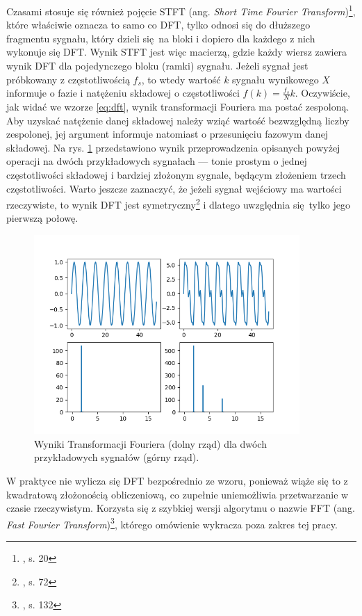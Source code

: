 Czasami stosuje się również pojęcie STFT (ang. \emph{Short Time Fourier Transform})\footnote{\cite{lerch_introduction_2012}, s. 20}, które właściwie oznacza to samo co DFT, tylko odnosi się do dłuższego fragmentu sygnału, który dzieli się na bloki i dopiero dla każdego z nich wykonuje się DFT. Wynik STFT jest więc macierzą, gdzie każdy wiersz zawiera wynik DFT dla pojedynczego bloku (ramki) sygnału. Jeżeli sygnał jest próbkowany z częstotliwością $f_s$, to wtedy wartość $k$ sygnału wynikowego $X$ informuje o fazie i natężeniu składowej o częstotliwości $f(k) = \frac{f_s}{N}k$.  Oczywiście, jak widać we wzorze \ref{eq:dft}, wynik transformacji Fouriera ma postać zespoloną. Aby uzyskać natężenie danej składowej należy wziąć wartość bezwzględną liczby zespolonej, jej argument informuje natomiast o przesunięciu fazowym danej składowej. Na rys.  \ref{fig:transformata_fouriera} przedstawiono wynik przeprowadzenia opisanych powyżej operacji na dwóch przykładowych sygnałach --- tonie prostym o jednej częstotliwości składowej i bardziej złożonym sygnale, będącym złożeniem trzech częstotliwości. Warto jeszcze zaznaczyć, że jeżeli sygnał wejściowy ma wartości rzeczywiste, to wynik DFT jest symetryczny\footnote{\cite{lyons_wprowadzenie_2000}, s. 72} i dlatego uwzględnia się tylko jego pierwszą połowę.

\begin{figure}[htb]
    \centering
    \includegraphics[width=0.9\textwidth]{images/transformata_fouriera}
    \caption{Wyniki Transformacji Fouriera (dolny rząd) dla dwóch przykładowych sygnałów (górny rząd).}
    \label{fig:transformata_fouriera}
\end{figure}

W praktyce nie wylicza się DFT bezpośrednio ze wzoru, ponieważ wiąże się to z kwadratową złożonością obliczeniową, co zupełnie uniemożliwia przetwarzanie w czasie rzeczywistym. Korzysta się z szybkiej wersji algorytmu o nazwie FFT (ang. \emph{Fast Fourier Transform})\footnote{\cite{lyons_wprowadzenie_2000}, s. 132}, którego omówienie wykracza poza zakres tej pracy.

